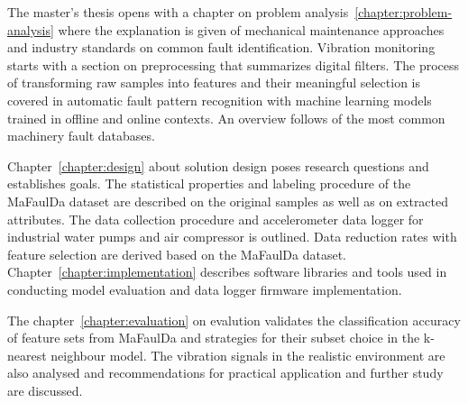 The master's thesis opens with a chapter on problem analysis~\ref{chapter:problem-analysis} where the explanation is given of mechanical maintenance approaches and industry standards on common fault identification. Vibration monitoring starts with a section on preprocessing that summarizes digital filters. The process of transforming raw samples into features and their meaningful selection is covered in automatic fault pattern recognition with machine learning models trained in offline and online contexts. An overview follows of the most common machinery fault databases.

Chapter~\ref{chapter:design} about solution design poses research questions and establishes goals. The statistical properties and labeling procedure of the MaFaulDa dataset are described on the original samples as well as on extracted attributes. The data collection procedure and accelerometer data logger for industrial water pumps and air compressor is outlined. Data reduction rates with feature selection are derived based on the MaFaulDa dataset. Chapter~\ref{chapter:implementation} describes software libraries and tools used in conducting model evaluation and data logger firmware implementation.

The chapter~\ref{chapter:evaluation} on evalution validates the classification accuracy of feature sets from MaFaulDa and strategies for their subset choice in the k-nearest neighbour model. The vibration signals in the realistic environment are also analysed and recommendations for practical application and further study are discussed.
